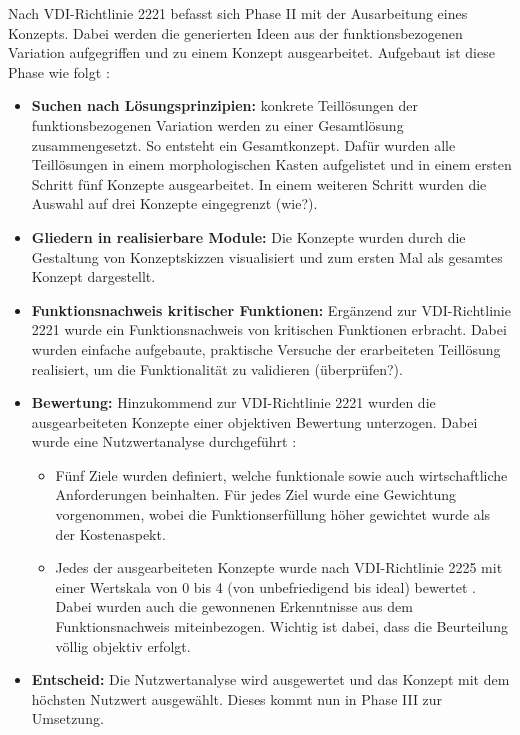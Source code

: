 Nach  VDI-Richtlinie 2221 befasst sich Phase II mit der Ausarbeitung eines Konzepts. Dabei werden die generierten Ideen aus der funktionsbezogenen Variation aufgegriffen und zu einem Konzept ausgearbeitet. Aufgebaut ist diese Phase wie folgt \cite{vdi2221}:

\begin{itemize}
	\item \textbf{Suchen nach Lösungsprinzipien:} konkrete Teillösungen der funktionsbezogenen Variation werden zu einer Gesamtlösung zusammengesetzt. So entsteht ein Gesamtkonzept. Dafür wurden alle Teillösungen in einem morphologischen Kasten aufgelistet und in einem ersten Schritt fünf Konzepte ausgearbeitet. In einem weiteren Schritt wurden die Auswahl auf drei Konzepte eingegrenzt (wie?).
	
	\item \textbf{Gliedern in realisierbare Module:} Die Konzepte wurden durch die Gestaltung von Konzeptskizzen visualisiert und zum ersten Mal als gesamtes Konzept dargestellt. 
	
	\item \textbf{Funktionsnachweis kritischer Funktionen:} Ergänzend zur VDI-Richtlinie 2221 wurde ein Funktionsnachweis von kritischen Funktionen erbracht. Dabei wurden einfache aufgebaute, praktische Versuche der erarbeiteten Teillösung realisiert, um die Funktionalität zu validieren (überprüfen?).
	
	\item \textbf{Bewertung:} Hinzukommend zur VDI-Richtlinie 2221 wurden die ausgearbeiteten Konzepte einer objektiven Bewertung unterzogen. Dabei wurde eine Nutzwertanalyse durchgeführt \cite{pahl}:
	\begin{itemize}
		\item Fünf Ziele wurden definiert, welche funktionale sowie auch wirtschaftliche Anforderungen beinhalten. Für jedes Ziel wurde eine Gewichtung vorgenommen, wobei die Funktionserfüllung höher gewichtet wurde als der Kostenaspekt.
		
		\item Jedes der ausgearbeiteten Konzepte wurde nach VDI-Richtlinie 2225 mit einer Wertskala von 0 bis 4 (von unbefriedigend bis ideal) bewertet \cite{vdi2225}. Dabei wurden auch die gewonnenen Erkenntnisse aus dem Funktionsnachweis miteinbezogen. Wichtig ist dabei, dass die Beurteilung völlig objektiv erfolgt.
	\end{itemize}	
	
	\item \textbf{Entscheid:} Die Nutzwertanalyse wird ausgewertet und das Konzept mit dem höchsten Nutzwert ausgewählt. Dieses kommt nun in Phase III zur Umsetzung. 
\end{itemize}


